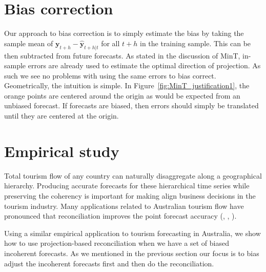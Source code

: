 \documentclass[12pt]{article}
\theoremstyle{definition}
\theoremstyle{property}
\begin{document}
	
	

	
	
	\section{Bias correction} \label{sec:BiasCorrection}
	Our approach to bias correction is to simply estimate the bias by taking the sample mean of $\bm{y
	}_{t+h}-\hat{\bm{y}}_{t+h|t}$ for all $t+h$ in the training sample.  This can be then subtracted from future forecasts.  As stated in the discussion of MinT, in-sample errors are already used to estimate the optimal direction of projection.  As such we see no problems with using the same errors to bias correct.  Geometrically, the intuition is simple.  In Figure~\ref{fig:MinT_justification1}, the orange points are centered around the origin as would be expected from an unbiased forecast.  If forecasts are biased, then errors should simply be translated until they are centered at the origin.
	
	\section{Empirical study} \label{sec:EmpStudy}
	
	Total tourism flow of any country can naturally disaggregate along a geographical hierarchy. Producing accurate forecasts for these hierarchical time series while preserving the coherency is important for making align business decisions in the tourism industry. Many applications related to Australian tourism flow have pronounced that reconciliation improves the point forecast accuracy (\cite{Athanasopoulos2009}, \cite{Hyndman2011}, \cite{WicEtAl2019}). 
	
	Using a similar empirical application to tourism forecasting in Australia, we show how to use projection-based reconciliation when we have a set of biased incoherent forecasts. As we mentioned in the previous section our focus is to bias adjust the incoherent forecasts first and then do the reconciliation. 
	
\end{document}
